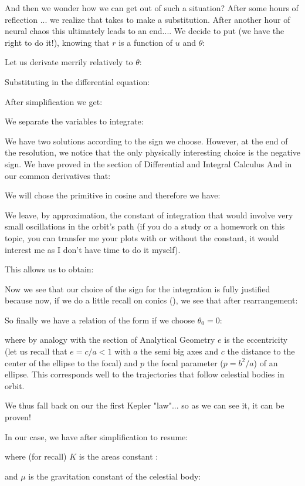 	And then we wonder how we can get out of such a situation? After some hours of reflection ... we realize that takes to make a substitution. After another hour of neural chaos this ultimately leads to an end.... We decide to put (we have the right to do it!), knowing that $r$ is a function of $u$ and $\theta$:
	
	Let us derivate merrily relatively to $\theta$:
	
	Substituting in the differential equation:
	
	After simplification we get:
	
	We separate the variables to integrate:
	
	We have two solutions according to the sign we choose. However, at the end of the resolution, we notice that the only physically interesting choice is the negative sign. We have proved in the section of Differential and Integral Calculus And in our common derivatives that:
	
	We will chose the primitive in cosine and therefore we have:
	
	We leave, by approximation, the constant of integration that would involve very small oscillations in the orbit's path (if you do a study or a homework on this topic, you can transfer me your plots with or without the constant, it would interest me as I don't  have time to do it myself).

	This allows us to obtain:
	
	Now we see that our choice of the sign for the integration is fully justified because now, if we do a little recall on conics (), we see that after rearrangement:
	
	So finally we have a relation of the form if we choose $\theta_0=0$:
	
	where by analogy with the section of Analytical Geometry $e$ is the eccentricity (let us recall that $e=c/a<1$ with $a$ the semi big axes and $c$ the distance to the center of the ellipse to the focal) and $p$ the focal parameter ($p=b^2/a$) of an ellipse. This corresponds well to the trajectories that follow celestial bodies in orbit.
	
	We thus fall back on our the first  Kepler "law"... so as we can see it, it can be proven!

	In our case, we have after simplification to resume:
	
	where (for recall) $K$ is the areas constant :
	
	and $\mu$ is the gravitation constant of the celestial body:
	
